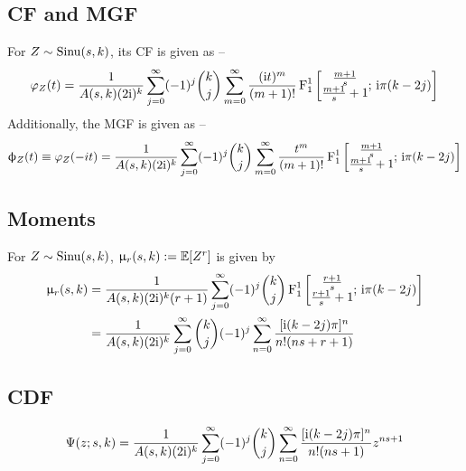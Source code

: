 \subsection{CF and MGF}
\begin{thm} \label{thm:cfmgf}
	For $Z \sim \operatorname*{Sinu}(s,k)$, its CF is given as --
	\begin{equation}\label{eq:cf}
		\varphi_Z(t) = \frac{1}{A(s,k) (2\mathrm i)^k} \sum_{j=0}^{\infty} (-1)^j \binom{k}{j} \sum_{m=0}^{\infty} \frac{(\mathrm i t)^m}{(m+1)!} \operatorname{F}^1_1\left[ \begin{matrix}\frac{m+1}{s}\\ \frac{m+1}{s} + 1 \end{matrix};\, \mathrm i\pi(k-2j) \right]
	\end{equation}
	Additionally, the MGF is given as --
	\begin{equation}
		\upphi_Z(t) \equiv \varphi_Z(-it) = \frac{1}{A(s,k) (2\mathrm i)^k} \sum_{j=0}^{\infty} (-1)^j \binom{k}{j} \sum_{m=0}^{\infty} \frac{t^m}{(m+1)!} \operatorname{F}^1_1\left[ \begin{matrix}\frac{m+1}{s}\\ \frac{m+1}{s} + 1 \end{matrix};\, \mathrm i\pi(k-2j) \right]
	\end{equation}
\end{thm}

\subsection{Moments}
\begin{thm}\label{thm:moments}
	For $Z \sim \operatorname*{Sinu}(s,k)$, $\upmu_r(s,k) := \mathbb E [Z^r]$ is given by
	\begin{align}
		\upmu_r(s,k) &= \frac{1}{A(s,k) (2\mathrm i)^k (r+1)} \sum_{j=0}^{\infty} (-1)^j \binom{k}{j} \operatorname{F}^1_1 \left[ \begin{matrix}\frac{r+1}{s}\\ \frac{r+1}{s} + 1\end{matrix}; \, \mathrm i\pi(k-2j) \right]\\
		&= \frac{1}{A(s,k) (2\mathrm i)^k} \sum_{j=0}^\infty {k \choose j} (-1)^j \sum_{n=0}^{\infty} \frac{[\mathrm i (k-2j) \pi]^n}{n! (ns+r+1)}
	\end{align}
\end{thm}

\subsection{CDF}
\begin{thm}\label{thm:cdf}
	\begin{equation}
		\Psi(z; s,k) = \frac{1}{A(s,k) (2\mathrm i)^k} \sum_{j=0}^\infty (-1)^j {k \choose j} \sum_{n=0}^{\infty} \frac{[\mathrm i (k-2j) \pi]^n}{n! (ns+1)} z^{ns+1}
	\end{equation}
\end{thm}

